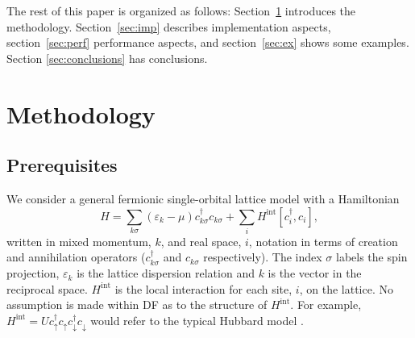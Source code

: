 \documentclass[3p,times,procedia]{elsarticle}
\begin{document}
The rest of this paper is organized as follows: Section~\ref{sec:meth} introduces the methodology. Section~\ref{sec:imp} describes  implementation aspects, section~\ref{sec:perf} performance aspects, and section~\ref{sec:ex} shows some examples. Section \ref{sec:conclusions} has conclusions.

\section{Methodology}\label{sec:meth}
\subsection{Prerequisites}
We consider a general fermionic single-orbital lattice model with a Hamiltonian
\begin{equation}
H = \sum_{k\sigma} (\varepsilon_k - \mu) c^\dagger_{k\sigma} c_{k\sigma} + \sum_i H^{\mathrm{int}} [c^\dagger_i, c_i],
\end{equation}
written in mixed momentum, $k$, and real space, $i$, notation in terms of creation and annihilation operators ($c^\dagger_{k\sigma}$ and $c_{k\sigma}$ respectively).  The index $\sigma$ labels the spin projection, $\varepsilon_k$ is the lattice dispersion relation and $k$ is the vector in the reciprocal space. 
$H^{\mathrm{int}}$ is the local interaction for each site, $i$, on the lattice. 
No assumption is made within DF as to the structure of $H^{\mathrm{int}}$.  For example, $H^{\mathrm{int}} = U c^\dagger_\uparrow c_\uparrow c^\dagger_\downarrow c_\downarrow$ would refer to the typical Hubbard model \cite{Hubbard1963}. 
\end{document}
